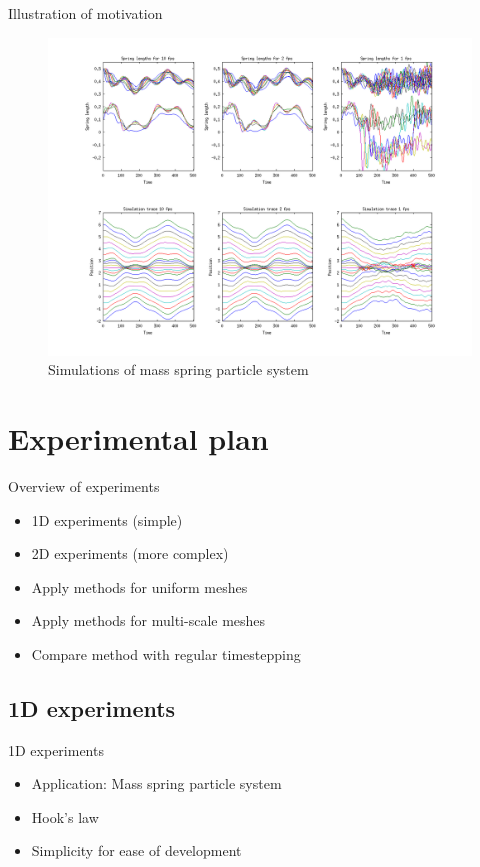 \begin{frame}{Illustration of motivation}
    \begin{figure}
        \center
        \includegraphics[width=\linewidth,keepaspectratio]{../images/spring_motivation.png}
        \caption{Simulations of mass spring particle system}
        \label{fig:motivation}
    \end{figure}
\end{frame}

\section{Experimental plan}
\begin{frame}{Overview of experiments}
    \begin{itemize}
        \item 1D experiments (simple)
        \item 2D experiments (more complex)
        \item Apply methods for uniform meshes 
        \item Apply methods for multi-scale meshes
        \item Compare method with regular timestepping
    \end{itemize}
\end{frame}

\subsection{1D experiments}
\begin{frame}{1D experiments}
    \begin{itemize}
        \item Application: Mass spring particle system
        \item Hook's law
        \item Simplicity for ease of development
    \end{itemize}
\end{frame}


